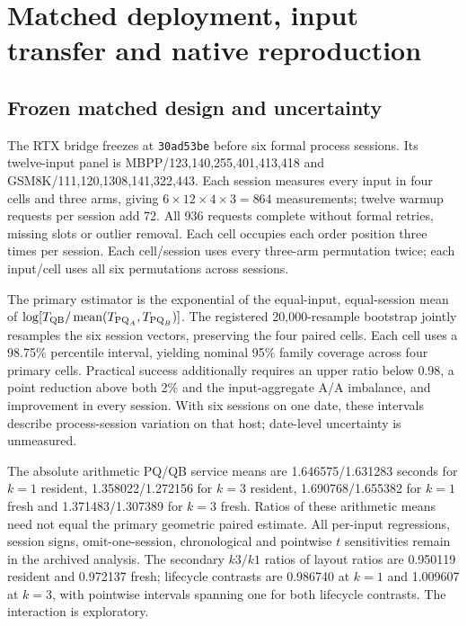 \section{Matched deployment, input transfer and native reproduction}
\label{supp:followup}
\subsection{Frozen matched design and uncertainty}
The RTX bridge freezes at \texttt{30ad53be} before six formal process sessions. Its twelve-input panel is MBPP/123,140,255,401,413,418 and GSM8K/111,120,1308,141,322,443. Each session measures every input in four cells and three arms, giving $6\times12\times4\times3=864$ measurements; twelve warmup requests per session add 72. All 936 requests complete without formal retries, missing slots or outlier removal. Each cell occupies each order position three times per session. Each cell/session uses every three-arm permutation twice; each input/cell uses all six permutations across sessions.

The primary estimator is the exponential of the equal-input, equal-session mean of $\log[T_{\mathrm{QB}}/\operatorname{mean}(T_{\mathrm{PQ}_A},T_{\mathrm{PQ}_B})]$. The registered 20,000-resample bootstrap jointly resamples the six session vectors, preserving the four paired cells. Each cell uses a 98.75\% percentile interval, yielding nominal 95\% family coverage across four primary cells. Practical success additionally requires an upper ratio below 0.98, a point reduction above both 2\% and the input-aggregate A/A imbalance, and improvement in every session. With six sessions on one date, these intervals describe process-session variation on that host; date-level uncertainty is unmeasured.

The absolute arithmetic PQ/QB service means are 1.646575/1.631283 seconds for $k=1$ resident, 1.358022/1.272156 for $k=3$ resident, 1.690768/1.655382 for $k=1$ fresh and 1.371483/1.307389 for $k=3$ fresh. Ratios of these arithmetic means need not equal the primary geometric paired estimate. All per-input regressions, session signs, omit-one-session, chronological and pointwise $t$ sensitivities remain in the archived analysis. The secondary $k3/k1$ ratios of layout ratios are 0.950119 resident and 0.972137 fresh; lifecycle contrasts are 0.986740 at $k=1$ and 1.009607 at $k=3$, with pointwise intervals spanning one for both lifecycle contrasts. The interaction is exploratory.

